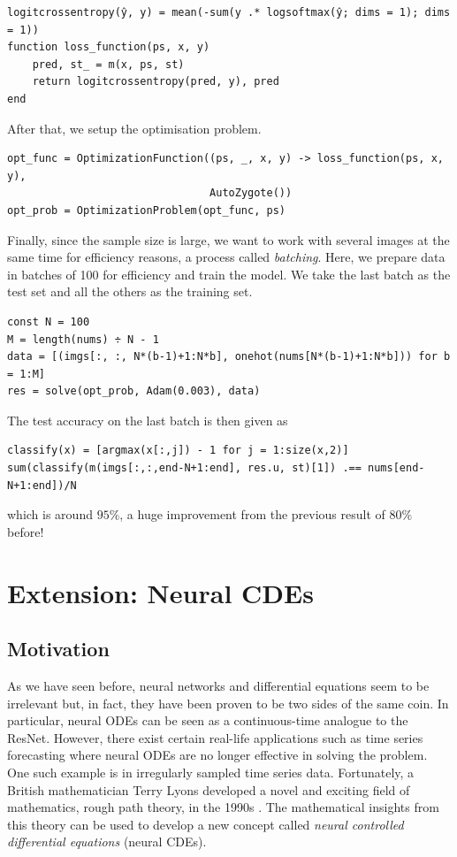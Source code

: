 \documentclass[a4paper,11pt,titlepage]{article}
\theoremstyle{definition}
\theoremstyle{plain}
\theoremstyle{remark}
\begin{document}
\begin{verbatim}
logitcrossentropy(ŷ, y) = mean(-sum(y .* logsoftmax(ŷ; dims = 1); dims = 1))
function loss_function(ps, x, y)
    pred, st_ = m(x, ps, st)
    return logitcrossentropy(pred, y), pred
end
\end{verbatim}

After that, we setup the optimisation problem.

\begin{verbatim}
opt_func = OptimizationFunction((ps, _, x, y) -> loss_function(ps, x, y),
                                AutoZygote())
opt_prob = OptimizationProblem(opt_func, ps)
\end{verbatim}

Finally, since the sample size is large, we want to work with several images at the same time for efficiency reasons, a process called \textit{batching}. Here, we prepare data in batches of 100 for efficiency and train the model. We take the last batch as the test set and all the others as the training set.

\begin{verbatim}
const N = 100
M = length(nums) ÷ N - 1
data = [(imgs[:, :, N*(b-1)+1:N*b], onehot(nums[N*(b-1)+1:N*b])) for b = 1:M]
res = solve(opt_prob, Adam(0.003), data)
\end{verbatim}

The test accuracy on the last batch is then given as

\begin{verbatim}
classify(x) = [argmax(x[:,j]) - 1 for j = 1:size(x,2)]
sum(classify(m(imgs[:,:,end-N+1:end], res.u, st)[1]) .== nums[end-N+1:end])/N
\end{verbatim}

which is around $95\%$, a huge improvement from the previous result of $80\%$ before!

\pagebreak
\section{Extension: Neural CDEs}
\label{sec:extension}

\subsection{Motivation}

As we have seen before, neural networks and differential equations seem to be irrelevant but, in fact, they have been proven to be two sides of the same coin. In particular, neural ODEs can be seen as a continuous-time analogue to the ResNet. However, there exist certain real-life applications such as time series forecasting where neural ODEs are no longer effective in solving the problem. One such example is in irregularly sampled time series data. Fortunately, a British mathematician Terry Lyons developed a novel and exciting field of mathematics, rough path theory, in the 1990s \cite{kidger2022neural}. The mathematical insights from this theory can be used to develop a new concept called \textit{neural controlled differential equations} (neural CDEs).
\end{document}
